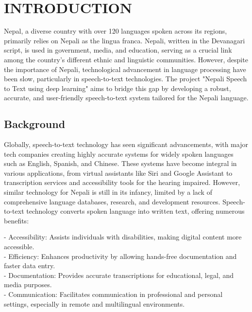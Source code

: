 \chapter{INTRODUCTION}

Nepal, a diverse country with over 120 languages spoken across its regions, primarily relies on Nepali as the lingua franca. Nepali, written in the Devanagari script, is used in government, media, and education, serving as a crucial link among the country's different ethnic and linguistic communities. However, despite the importance of Nepali, technological advancement in language processing have been slow, particularly in speech-to-text 
technologies. The project "Nepali Speech to Text using deep learning" aims to bridge this gap by developing a robust, accurate, and user-friendly speech-to-text system tailored for the Nepali language.
\section{Background}
Globally, speech-to-text technology has seen significant advancements, with major tech companies creating highly accurate systems for widely spoken languages such as English, Spanish, and Chinese. These systems have become integral in various applications, from virtual assistants like Siri and Google Assistant to transcription services and accessibility tools for the hearing impaired. However, similar technology for Nepali is still in its infancy\cite{link6}, limited by a lack of comprehensive language databases, research, and development resources. Speech-to-text technology converts spoken language into written text, offering numerous benefits:

- Accessibility: Assists individuals with disabilities, making digital content more accessible. \\ - Efficiency: Enhances productivity by allowing hands-free documentation and faster data 
entry. \\ - Documentation: Provides accurate transcriptions for educational, legal, and media purposes. \\ - Communication: Facilitates communication in professional and personal settings, especially in remote and multilingual environments.
 

\\\\

